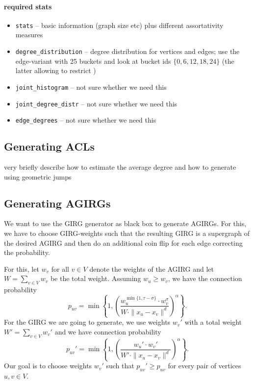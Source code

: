 \documentclass[a4paper,11pt]{article}
\begin{document}
\paragraph{required stats}

\begin{itemize}
\item \texttt{stats} -- basic information (graph size etc)
  plus different assortativity measures
\item \texttt{degree\_distribution} -- degree distribution for vertices
  and edges; use the edge-variant with 25 buckets and look at bucket
  ids $\{0, 6, 12, 18, 24\}$ (the latter allowing to restrict )
\item \texttt{joint\_histogram} -- not sure whether we need this
\item \texttt{joint\_degree\_distr} -- not sure whether we need this
\item \texttt{edge\_degrees} -- not sure whether we need this
\end{itemize}



\subsection{Generating ACLs}
\label{sec:generating-acls}

very briefly describe how to estimate the average degree and how to
generate using geometric jumps


\subsection{Generating AGIRGs}
\label{sec:generating-agirgs}


We want to use the GIRG generator as black box to generate AGIRGs.
For this, we have to choose GIRG-weights such that the resulting GIRG
is a supergraph of the desired AGIRG and then do an additional coin
flip for each edge correcting the probability.

For this, let $w_v$ for all $v \in V$ denote the weights of the AGIRG
and let $W = \sum_{v \in V} w_v$ be the total weight.  Assuming
$w_u \ge w_v$, we have the connection probability
%
\begin{equation*}
  p_{uv} = \min \left\{ 1, \left( \frac{w_u^{\min\{1, \tau - \sigma\}}
        \cdot w_v^\sigma}{W\cdot \rVert x_u - x_v\rVert^d}
    \right)^\alpha \right\}. 
\end{equation*}
%
For the GIRG we are going to generate, we use weights $w_v'$ with a
total weight $W' = \sum_{v \in V} w_v'$ and we have connection
probability
%
\begin{equation*}
  p_{uv}' = \min \left\{ 1, \left( \frac{w_u' \cdot w_v'}{W'\cdot
        \rVert x_u - x_v\rVert^d} \right)^\alpha \right\}.
\end{equation*}
%
Our goal is to choose weights $w_v'$ such that $p_{uv}' \ge p_{uv}$
for every pair of vertices $u, v \in V$.
\end{document}
